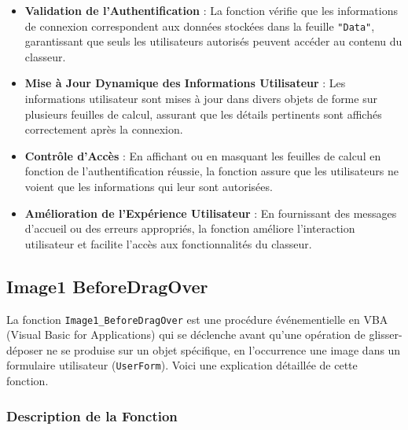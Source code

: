 \documentclass[a4paper, oneside, 12pt, final]{extreport}
\begin{document}
\begin{itemize}
    \item \textbf{Validation de l'Authentification} : La fonction vérifie que les informations de connexion correspondent aux données stockées dans la feuille \texttt{"Data"}, garantissant que seuls les utilisateurs autorisés peuvent accéder au contenu du classeur.
    \item \textbf{Mise à Jour Dynamique des Informations Utilisateur} : Les informations utilisateur sont mises à jour dans divers objets de forme sur plusieurs feuilles de calcul, assurant que les détails pertinents sont affichés correctement après la connexion.
    \item \textbf{Contrôle d'Accès} : En affichant ou en masquant les feuilles de calcul en fonction de l'authentification réussie, la fonction assure que les utilisateurs ne voient que les informations qui leur sont autorisées.
    \item \textbf{Amélioration de l'Expérience Utilisateur} : En fournissant des messages d'accueil ou des erreurs appropriés, la fonction améliore l'interaction utilisateur et facilite l'accès aux fonctionnalités du classeur.
\end{itemize}

\subsection{Image1 BeforeDragOver}

La fonction \texttt{Image1\_BeforeDragOver} est une procédure événementielle en VBA (Visual Basic for Applications) qui se déclenche avant qu'une opération de glisser-déposer ne se produise sur un objet spécifique, en l'occurrence une image dans un formulaire utilisateur (\texttt{UserForm}). Voici une explication détaillée de cette fonction.

\subsubsection{Description de la Fonction}
\end{document}
